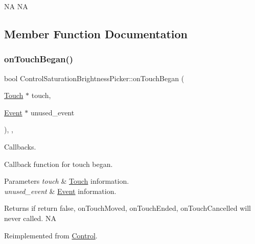 NA  NA 

\subsection{Member Function Documentation}
\mbox{\label{classControlSaturationBrightnessPicker_a4de153e53cccd78b56d9dc3e18411777}} 
\subsubsection{\texorpdfstring{on\+Touch\+Began()}{onTouchBegan()}\hspace{0.1cm}{\footnotesize\ttfamily [1/2]}}
{\footnotesize\ttfamily bool Control\+Saturation\+Brightness\+Picker\+::on\+Touch\+Began (\begin{DoxyParamCaption}\item[{\hyperlink{classTouch}{Touch} $\ast$}]{touch,  }\item[{\hyperlink{classEvent}{Event} $\ast$}]{unused\+\_\+event }\end{DoxyParamCaption})\hspace{0.3cm}{\ttfamily [override]}, {\ttfamily [protected]}, {\ttfamily [virtual]}}



Callbacks. 

Callback function for touch began.


\begin{DoxyParams}{Parameters}
{\em touch} & \hyperlink{classTouch}{Touch} information. \\
\hline
{\em unused\+\_\+event} & \hyperlink{classEvent}{Event} information. \\
\hline
\end{DoxyParams}
\begin{DoxyReturn}{Returns}
if return false, on\+Touch\+Moved, on\+Touch\+Ended, on\+Touch\+Cancelled will never called.  NA 
\end{DoxyReturn}


Reimplemented from \hyperlink{classControl_a0cf2e20cea5b57b263e965be4a19ab52}{Control}.

\mbox{\label{classControlSaturationBrightnessPicker_a8660ed765c6c5c0d8856f59aa0ba34b2}} 
